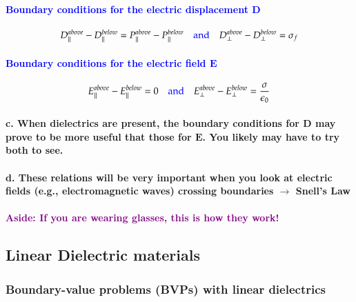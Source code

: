 \documentclass{article}
\begin{document}
\paragraph{\textcolor{blue}{Boundary conditions for the electric displacement $\boldsymbol{D}$}}
\begin{equation*}
     D_{\parallel}^{above}-D_{\parallel}^{below}=P_{\parallel}^{above}-P_{\parallel}^{below}\quad\text{\textcolor{blue}{and}}\quad D_{\perp}^{above}-D_{\perp}^{below}=\sigma_f
\end{equation*}
\paragraph{\textcolor{blue}{Boundary conditions for the electric field $\boldsymbol{E}$}}
\begin{equation*}
     E_{\parallel}^{above}-E_{\parallel}^{below}=0\quad\text{\textcolor{blue}{and}}\quad E_{\perp}^{above}-E_{\perp}^{below}=\frac{\sigma}{\epsilon_0}
\end{equation*}
\paragraph{c. When dielectrics are present, the boundary conditions for $\boldsymbol{D}$ may prove to be more useful that those for $\boldsymbol{E}$. You likely may have to try both to see.}
\paragraph{d. These relations will be very important when you look at electric fields (e.g., electromagnetic waves) crossing boundaries $\rightarrow$ Snell's Law}
\paragraph{\textcolor{purple}{Aside: If you are wearing glasses, this is how they work!}}
\subsection{Linear Dielectric materials}
\subsubsection{Boundary-value problems (BVPs) with linear dielectrics}
\end{document}
